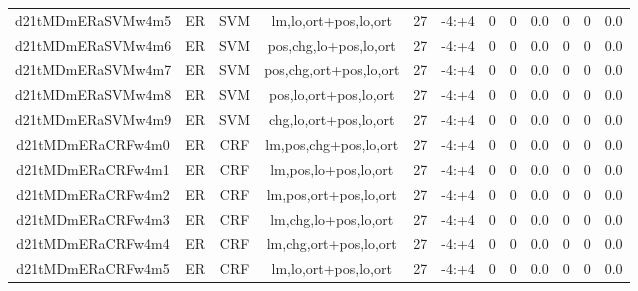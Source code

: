 \documentclass[a4paper]{article}
\begin{document}
\begin{landscape}
\begin{center}
\begin{tabular}{ |c|c|c|c|c|c|c|c|c|c|c|c|}
 
 	
 	\small{ d21tMDmERaSVMw4m5 } & ER & SVM & lm,lo,ort+pos,lo,ort  &  27 &  -4:+4  &  0 & 0 & 0.0  &  0 & 0 & 0.0 \\
 	

 
 	
 	\small{ d21tMDmERaSVMw4m6 } & ER & SVM & pos,chg,lo+pos,lo,ort  &  27 &  -4:+4  &  0 & 0 & 0.0  &  0 & 0 & 0.0 \\
 	

 
 	
 	\small{ d21tMDmERaSVMw4m7 } & ER & SVM & pos,chg,ort+pos,lo,ort  &  27 &  -4:+4  &  0 & 0 & 0.0  &  0 & 0 & 0.0 \\
 	

 
 	
 	\small{ d21tMDmERaSVMw4m8 } & ER & SVM & pos,lo,ort+pos,lo,ort  &  27 &  -4:+4  &  0 & 0 & 0.0  &  0 & 0 & 0.0 \\
 	

 
 	
 	\small{ d21tMDmERaSVMw4m9 } & ER & SVM & chg,lo,ort+pos,lo,ort  &  27 &  -4:+4  &  0 & 0 & 0.0  &  0 & 0 & 0.0 \\
 	

 
 	
 	\small{ d21tMDmERaCRFw4m0 } & ER & CRF & lm,pos,chg+pos,lo,ort  &  27 &  -4:+4  &  0 & 0 & 0.0  &  0 & 0 & 0.0 \\
 	

 
 	
 	\small{ d21tMDmERaCRFw4m1 } & ER & CRF & lm,pos,lo+pos,lo,ort  &  27 &  -4:+4  &  0 & 0 & 0.0  &  0 & 0 & 0.0 \\
 	

 
 	
 	\small{ d21tMDmERaCRFw4m2 } & ER & CRF & lm,pos,ort+pos,lo,ort  &  27 &  -4:+4  &  0 & 0 & 0.0  &  0 & 0 & 0.0 \\
 	

 
 	
 	\small{ d21tMDmERaCRFw4m3 } & ER & CRF & lm,chg,lo+pos,lo,ort  &  27 &  -4:+4  &  0 & 0 & 0.0  &  0 & 0 & 0.0 \\
 	

 
 	
 	\small{ d21tMDmERaCRFw4m4 } & ER & CRF & lm,chg,ort+pos,lo,ort  &  27 &  -4:+4  &  0 & 0 & 0.0  &  0 & 0 & 0.0 \\
 	

 
 	
 	\small{ d21tMDmERaCRFw4m5 } & ER & CRF & lm,lo,ort+pos,lo,ort  &  27 &  -4:+4  &  0 & 0 & 0.0  &  0 & 0 & 0.0 \\
 	

\end{tabular}
\end{center}
\end{landscape}
\end{document}
